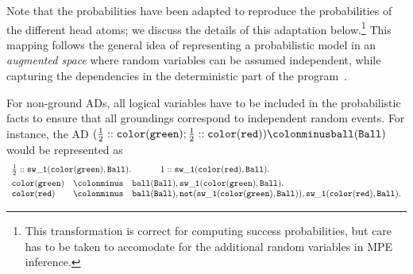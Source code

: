 \documentclass[a4paper]{article}
\begin{document}
Note that the probabilities have been adapted to reproduce the
probabilities of the different head atoms; we discuss the details of
this adaptation below.\footnote{This
  transformation is correct for computing success probabilities, but
  care has to be taken to accomodate for the additional random variables in
  MPE inference.}
This mapping follows the general idea of representing a probabilistic
model in an \emph{augmented space} where random variables can be
assumed independent, while capturing the dependencies in the
deterministic part of the program~\citep{Poole10}.

For non-ground ADs, all logical variables have to be included in the
probabilistic facts to ensure that all groundings correspond to
independent random events. For instance, the AD
$( \frac{1}{2}::\mathtt{color(green)} ;
\frac{1}{2}::\mathtt{color(red)}) \colonminus \mathtt{ball(Ball)}$
would be represented as 
\begin{alignat*}{2}
&\begin{array}{lll}
\frac{1}{2} :: \mathtt{sw\_1(color(green),Ball)\ldotp} & ~~~~ &
1 :: \mathtt{sw\_1(color(red),Ball)\ldotp} 
\end{array}\\
&\begin{array}{lll}
\mathtt{color(green)}  & \mathtt{\colonminus} &\mathtt{ball(Ball),sw\_1(color(green),Ball)}\ldotp\\
\mathtt{color(red)}     & \mathtt{\colonminus} & \mathtt{ball(Ball),not(sw\_1(color(green),Ball)),  sw\_1(color(red),Ball)}\ldotp
\end{array}
\end{alignat*}
\end{document}
